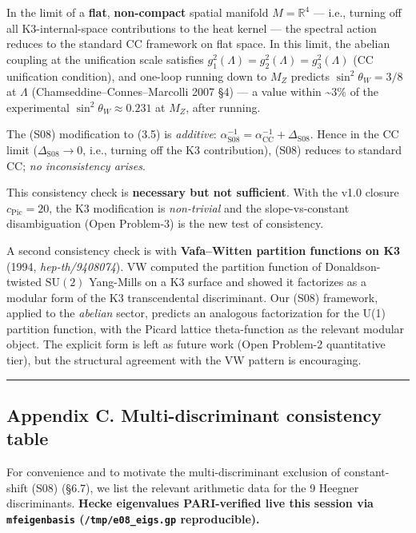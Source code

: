 \documentclass[
  11pt,
  a4paper,
]{article}
\begin{document}
In the limit of a \textbf{flat}, \textbf{non-compact} spatial manifold \(M = \mathbb R^4\) --- i.e., turning off all K3-internal-space contributions to the heat kernel --- the spectral action reduces to the standard CC framework on flat space. In this limit, the abelian coupling at the unification scale satisfies \(g_1^2(\Lambda) = g_2^2(\Lambda) = g_3^2(\Lambda)\) (CC unification condition), and one-loop running down to \(M_Z\) predicts \(\sin^2 \theta_W = 3/8\) at \(\Lambda\) (Chamseddine--Connes--Marcolli 2007 §4) --- a value within \textasciitilde3\% of the experimental \(\sin^2\theta_W \approx 0.231\) at \(M_Z\), after running.

The (S08) modification to (3.5) is \emph{additive}: \(\alpha^{-1}_{\mathrm{S08}} = \alpha^{-1}_{\mathrm{CC}} + \Delta_{\mathrm{S08}}\). Hence in the CC limit (\(\Delta_{\mathrm{S08}} \to 0\), i.e., turning off the K3 contribution), (S08) reduces to standard CC; \emph{no inconsistency arises}.

This consistency check is \textbf{necessary but not sufficient}. With the v1.0 closure \(c_{\mathrm{Pic}} = 20\), the K3 modification is \emph{non-trivial} and the slope-vs-constant disambiguation (Open Problem-3) is the new test of consistency.

A second consistency check is with \textbf{Vafa--Witten partition functions on K3} (1994, \emph{hep-th/9408074}). VW computed the partition function of Donaldson-twisted \(\mathrm{SU}(2)\) Yang-Mills on a K3 surface and showed it factorizes as a modular form of the K3 transcendental discriminant. Our (S08) framework, applied to the \emph{abelian} sector, predicts an analogous factorization for the U(1) partition function, with the Picard lattice theta-function as the relevant modular object. The explicit form is left as future work (Open Problem-2 quantitative tier), but the structural agreement with the VW pattern is encouraging.

\begin{center}\rule{0.5\linewidth}{0.5pt}\end{center}

\hypertarget{appendix-c.-multi-discriminant-consistency-table}{%
\subsection{Appendix C. Multi-discriminant consistency table}\label{appendix-c.-multi-discriminant-consistency-table}}

For convenience and to motivate the multi-discriminant exclusion of constant-shift (S08) (§6.7), we list the relevant arithmetic data for the 9 Heegner discriminants. \textbf{Hecke eigenvalues PARI-verified live this session via \texttt{mfeigenbasis} (\texttt{/tmp/e08\_eigs.gp} reproducible).}
\end{document}
